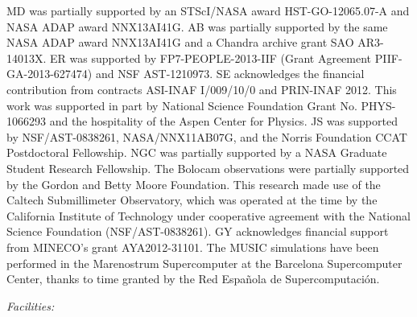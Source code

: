\documentclass[iop,twocolumn]{emulateapj}
\begin{document}
{\acknowledgments


MD was partially supported by an STScI/NASA award 
HST-GO-12065.07-A  and NASA ADAP award NNX13AI41G. AB was partially 
supported by the same NASA ADAP award NNX13AI41G and a Chandra archive grant SAO AR3-14013X.
ER was supported by FP7-PEOPLE-2013-IIF (Grant Agreement PIIF-GA-2013-627474) and NSF AST-1210973.
SE acknowledges the financial contribution from contracts ASI-INAF I/009/10/0 and PRIN-INAF 2012.
This work was supported in part by National Science Foundation Grant No. PHYS-1066293 and the hospitality of the Aspen Center for Physics.
JS was supported by NSF/AST-0838261, NASA/NNX11AB07G, and the Norris Foundation CCAT Postdoctoral Fellowship. NGC was partially supported by a NASA Graduate Student Research Fellowship. The Bolocam observations were partially supported by the Gordon and Betty Moore Foundation. This research made use of the Caltech Submillimeter Observatory, which was operated at the time by the California Institute of Technology under cooperative agreement with the National Science Foundation (NSF/AST-0838261).
GY acknowledges  financial support from   MINECO's  grant   AYA2012-31101. 
 The MUSIC simulations have been performed in the Marenostrum Supercomputer at  the Barcelona Supercomputer Center,  thanks to time granted by the Red Espa\~nola de Supercomputaci\'on.



{\it Facilities:} 

}
\end{document}
